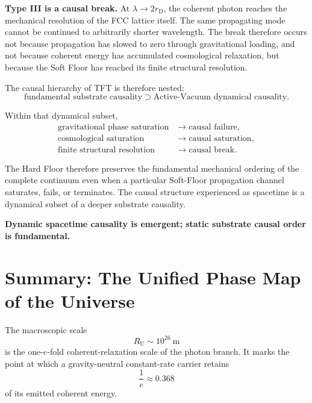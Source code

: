 \textbf{Type III is a causal break.}
At
$\lambda\rightarrow2r_{\mathrm D}$, the coherent photon reaches the mechanical resolution of the FCC lattice itself. The same propagating mode cannot be continued to arbitrarily shorter wavelength. The break therefore occurs not because propagation has slowed to zero through gravitational loading, and not because coherent energy has accumulated cosmological relaxation, but because the Soft Floor has reached its finite structural resolution.

The causal hierarchy of TFT is therefore nested:
\begin{equation}
    \text{fundamental substrate causality}
    \supset
    \text{Active-Vacuum dynamical causality}.
\end{equation}

Within that dynamical subset,
\begin{equation}
\begin{aligned}
    \text{gravitational phase saturation}
    &\longrightarrow
    \text{causal failure},
    \\
    \text{cosmological saturation}
    &\longrightarrow
    \text{causal saturation},
    \\
    \text{finite structural resolution}
    &\longrightarrow
    \text{causal break}.
\end{aligned}
\end{equation}

The Hard Floor therefore preserves the fundamental mechanical ordering of the complete continuum even when a particular Soft-Floor propagation channel saturates, fails, or terminates. The causal structure experienced as spacetime is a dynamical subset of a deeper substrate causality.

\textbf{Dynamic spacetime causality is emergent; static substrate causal order is fundamental.}

\section*{Summary: The Unified Phase Map of the Universe}
\label{sec:unified_phase_summary}

The macroscopic scale
\begin{equation}
    R_{\mathrm U} \sim 10^{26}\ \mathrm{m}
\end{equation}
is the one-$e$-fold coherent-relaxation scale of the photon branch. It marks the point at which a gravity-neutral constant-rate carrier retains
\begin{equation}
    \frac{1}{e} \approx 0.368
\end{equation}
of its emitted coherent energy.

